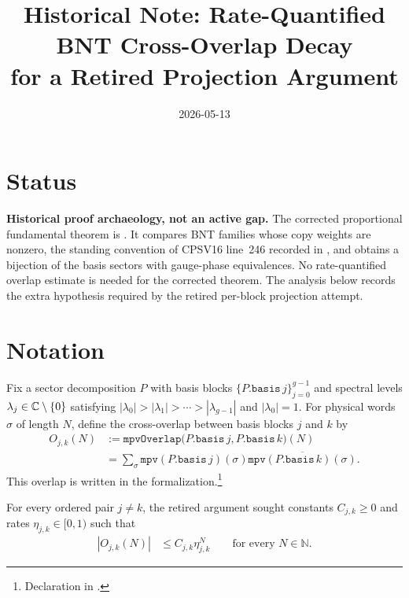 \documentclass{article}
\title{Historical Note: Rate-Quantified BNT Cross-Overlap Decay\\
       for a Retired Projection Argument}
\author{}
\date{2026-05-13}
\begin{document}
\maketitle
{}

\section{Status}

\textbf{Historical proof archaeology, not an active gap.}
The corrected proportional fundamental theorem is
. It compares
BNT families whose copy weights are nonzero, the standing convention of
CPSV16 line~246 recorded in
, and obtains a
bijection of the basis sectors with gauge-phase equivalences. No
rate-quantified overlap estimate is needed for the corrected theorem. The
analysis below records the extra hypothesis required by the retired per-block
projection attempt.

\section{Notation}

Fix a sector decomposition $P$ with basis blocks
$\{P.\mathtt{basis}\,j\}_{j=0}^{g-1}$ and spectral levels
$\lambda_j\in\mathbb{C}\setminus\{0\}$ satisfying
$|\lambda_0|>|\lambda_1|>\cdots>|\lambda_{g-1}|$ and
$|\lambda_0|=1$. For physical words $\sigma$ of length $N$, define the
cross-overlap between basis blocks $j$ and $k$ by
\begin{align}
    O_{j,k}(N)
        &:= \mathtt{mpvOverlap}\bigl(P.\mathtt{basis}\,j,
                                    P.\mathtt{basis}\,k\bigr)(N)
    \label{eq:bnt-rate_cross_overlap_definition}\\
        &= \sum_{\sigma}
            \mathtt{mpv}(P.\mathtt{basis}\,j)(\sigma)
            \overline{\mathtt{mpv}(P.\mathtt{basis}\,k)(\sigma)}.
    \label{eq:bnt-rate_cross_overlap_expansion}
\end{align}
This overlap is written  in the
formalization.\footnote{Declaration  in
    .}

For every ordered pair $j\ne k$, the retired argument sought constants
$C_{j,k}\geq 0$ and rates $\eta_{j,k}\in[0,1)$ such that
\begin{align}
    |O_{j,k}(N)|
        &\leq C_{j,k}\eta_{j,k}^{N}
        \qquad\text{for every }N\in\mathbb N.
    \label{eq:bnt-rate_geometric_cross_overlap_bound}
\end{align}
\end{document}
